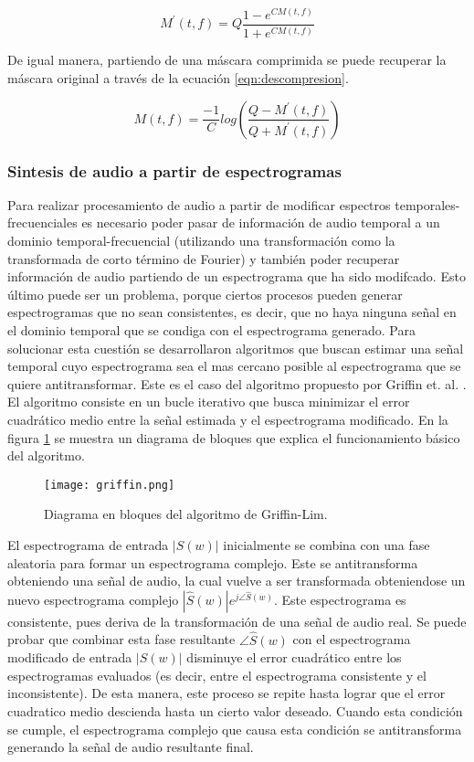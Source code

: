 \begin{equation}
\label{eqn:compresion}
	M^{'}(t,f) = Q\frac{1-e^{CM(t,f)}}{1+e^{CM(t,f)}}  
\end{equation}

De igual manera, partiendo de una máscara comprimida se puede recuperar la máscara original a través de la ecuación \ref{eqn:descompresion}. 

\begin{equation}
\label{eqn:descompresion}
	M(t,f) = \frac{-1}{C}log(\frac{Q-M^{'}(t,f)}{Q+M^{'}(t,f)})
\end{equation}

\subsubsection{Sintesis de audio a partir de espectrogramas}

Para realizar procesamiento de audio a partir de modificar espectros temporales-frecuenciales es necesario poder pasar de información de audio temporal a un dominio temporal-frecuencial (utilizando una transformación como la transformada de corto término de Fourier) y también poder recuperar información de audio partiendo de un espectrograma que ha sido modifcado. Esto último puede ser un problema, porque ciertos procesos pueden generar espectrogramas que no sean consistentes, es decir, que no haya ninguna señal en el dominio temporal que se condiga con el espectrograma generado. Para solucionar esta cuestión se desarrollaron algoritmos que buscan estimar una señal temporal cuyo espectrograma sea el mas cercano posible al espectrograma que se quiere antitransformar. Este es el caso del algoritmo propuesto por Griffin et. al. \cite{griffinlim}. El algoritmo consiste en un bucle iterativo que busca minimizar el error cuadrático medio entre la señal estimada y el espectrograma modificado. En la figura \ref{fig:griffin} se muestra un diagrama de bloques que explica el funcionamiento básico del algoritmo. 

\begin{figure}[H]
  \centering{}
  \texttt{[image: griffin.png]}
  \caption{Diagrama en bloques del algoritmo de Griffin-Lim.}
  \label{fig:griffin}
\end{figure}

El espectrograma de entrada $\left | S(w) \right |$ inicialmente se combina con una fase aleatoria para formar un espectrograma complejo. Este se antitransforma obteniendo una señal de audio, la cual vuelve a ser transformada obteniendose un nuevo espectrograma complejo $\left | \hat{S}(w) \right |e^{j\angle \hat{S}(w)}$. Este espectrograma es consistente, pues deriva de la transformación de una señal de audio real. Se puede probar que combinar esta fase resultante $\angle \hat{S}(w)$ con el espectrograma modificado de entrada $\left | S(w) \right |$ disminuye el error cuadrático entre los espectrogramas evaluados (es decir, entre el espectrograma consistente y el inconsistente). De esta manera, este proceso se repite hasta lograr que el error cuadratico medio descienda hasta un cierto valor deseado. Cuando esta condición se cumple, el espectrograma complejo que causa esta condición se antitransforma generando la señal de audio resultante final. 

